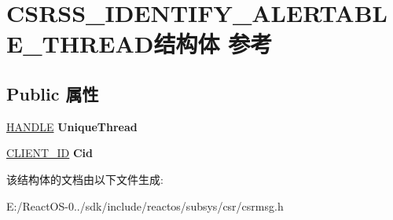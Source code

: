 \hypertarget{struct_c_s_r_s_s___i_d_e_n_t_i_f_y___a_l_e_r_t_a_b_l_e___t_h_r_e_a_d}{}\section{C\+S\+R\+S\+S\+\_\+\+I\+D\+E\+N\+T\+I\+F\+Y\+\_\+\+A\+L\+E\+R\+T\+A\+B\+L\+E\+\_\+\+T\+H\+R\+E\+A\+D结构体 参考}
\label{struct_c_s_r_s_s___i_d_e_n_t_i_f_y___a_l_e_r_t_a_b_l_e___t_h_r_e_a_d}
\subsection*{Public 属性}
\begin{DoxyCompactItemize}
\item 
\mbox{\label{struct_c_s_r_s_s___i_d_e_n_t_i_f_y___a_l_e_r_t_a_b_l_e___t_h_r_e_a_d_a359a8314d300e8754603631e9420672f}} 
\hyperlink{interfacevoid}{H\+A\+N\+D\+LE} {\bfseries Unique\+Thread}
\item 
\mbox{\label{struct_c_s_r_s_s___i_d_e_n_t_i_f_y___a_l_e_r_t_a_b_l_e___t_h_r_e_a_d_a9ca274b4bbe8974139d3701afc8349fa}} 
\hyperlink{struct___c_l_i_e_n_t___i_d}{C\+L\+I\+E\+N\+T\+\_\+\+ID} {\bfseries Cid}
\end{DoxyCompactItemize}


该结构体的文档由以下文件生成\+:\begin{DoxyCompactItemize}
\item 
E\+:/\+React\+O\+S-\/0../sdk/include/reactos/subsys/csr/csrmsg.\+h\end{DoxyCompactItemize}

